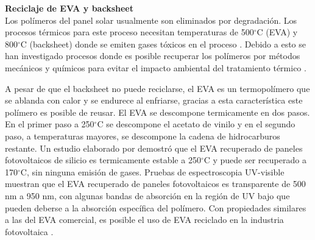 \textbf{Reciclaje de EVA y backsheet}\\
Los polímeros del panel solar usualmente son eliminados por degradación. Los procesos térmicos para este proceso necesitan temperaturas de 500$^{\circ}$C (EVA) y 800$^{\circ}$C (backsheet) donde se emiten gases tóxicos en el proceso \citep{Fiandra2019,Farneth2012}. 
Debido a esto se han investigado procesos donde es posible recuperar los polímeros por métodos mecánicos y químicos para evitar el impacto ambiental del tratamiento térmico \citep{Azeumo2019,Fiandra2019,Pagnanelli2019}. 

A pesar de que el backsheet no puede reciclarse, el EVA es un termopolímero que se ablanda con calor y se endurece al enfriarse, gracias a esta característica este polímero es posible de reusar. 
El EVA se descompone termicamente en dos pasos. En el primer paso a 250$^{\circ}$C se descompone el acetato de vinilo y en el segundo paso, a temperaturas mayores, se descompone la cadena de hidrocarburos restante. Un estudio elaborado por \citet{Chitra2020} demostró que el EVA recuperado de paneles fotovoltaicos de silicio es termicamente estable a 250$^{\circ}$C y puede ser recuperado a 170$^{\circ}$C, sin ninguna emisión de gases. Pruebas de espectroscopia UV-visible muestran que el EVA recuperado de paneles fotovoltaicos es transparente de 500 nm a 950 nm, con algunas bandas de absorción en la región de UV bajo que pueden deberse a la absorción específica del polímero. Con propiedades similares a las del EVA comercial, es posible el uso de EVA reciclado en la industria fotovoltaica \citep{Chitra2020}.  

  